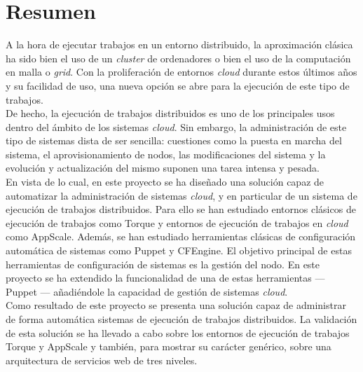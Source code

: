 \chapter{Resumen}
\label{cap:resumen}


A la hora de ejecutar trabajos en un entorno distribuido, la aproximación clásica ha sido bien el uso de un \emph{cluster} de ordenadores o bien el uso de la computación en malla o \emph{grid}. Con la proliferación de entornos \emph{cloud} durante estos últimos años y su facilidad de uso, una nueva opción se abre para la ejecución de este tipo de trabajos.\\

De hecho, la ejecución de trabajos distribuidos es uno de los principales usos dentro del ámbito de los sistemas \emph{cloud}. Sin embargo, la administración de este tipo de sistemas dista de ser sencilla: cuestiones como la puesta en marcha del sistema, el aprovisionamiento de nodos, las modificaciones del sistema y la evolución y actualización del mismo suponen una tarea intensa y pesada.\\

En vista de lo cual, en este proyecto se ha diseñado una solución capaz de automatizar la administración de sistemas \emph{cloud}, y en particular de un sistema de ejecución de trabajos distribuidos. Para ello se han estudiado entornos clásicos de ejecución de trabajos como Torque y entornos de ejecución de trabajos en \emph{cloud} como AppScale. Además, se han estudiado herramientas clásicas de configuración automática de sistemas como Puppet y CFEngine. El objetivo principal de estas herramientas de configuración de sistemas es la gestión del nodo. En este proyecto se ha extendido la funcionalidad de una de estas herramientas --- Puppet --- añadiéndole la capacidad de gestión de sistemas \emph{cloud}.\\

Como resultado de este proyecto se presenta una solución capaz de administrar de forma automática sistemas de ejecución de trabajos distribuidos. La validación de esta solución se ha llevado a cabo sobre los entornos de ejecución de trabajos Torque y AppScale y también, para mostrar su carácter genérico, sobre una arquitectura de servicios web de tres niveles.
